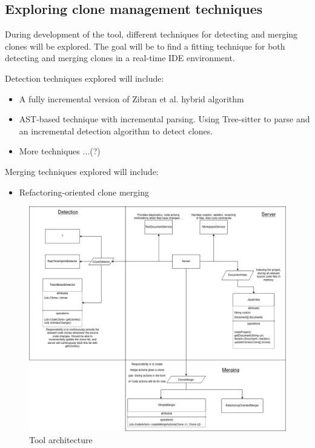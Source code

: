 \documentclass[12pt]{article}
\begin{document}
\subsection{Exploring clone management techniques}

During development of the tool, different techniques for detecting and merging clones will
be explored. The goal will be to find a fitting technique for both detecting and merging
clones in a real-time IDE environment.

Detection techniques explored will include:

\begin{itemize}
	\item A fully incremental version of Zibran et al. hybrid
	      algorithm\cite{Zibran_real_time_search}
	\item AST-based technique with incremental parsing. Using Tree-sitter to parse and an
        incremental detection algorithm to detect clones.
	\item More techniques ...(?)
\end{itemize}

Merging techniques explored will include:

\begin{itemize}
	\item Refactoring-oriented clone merging\cite{RefactoringOrientedClonesAndMerging}
\end{itemize}

\begin{figure}
	\includegraphics[width=\textwidth]{images/ToolArchitecture.png}
	\caption{Tool architecture}
	\label{fig:architecture}
\end{figure}
\end{document}
